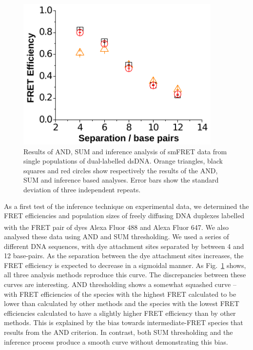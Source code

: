 \begin{figure}
   \begin{center}
      \includegraphics*[width=4in]{inference/fig6_single_ppltn.pdf}
      \caption{Results of AND, SUM and inference analysis of smFRET data from single populations of dual-labelled dsDNA. Orange triangles, black squares and red circles show respectively the results of the AND, SUM and inference based analyses. Error bars show the standard deviation of three independent repeats.}
      \label{fig:fig6_real_single}
   \end{center}
\end{figure}

As a first test of the inference technique on experimental data, we determined the FRET efficiencies and population sizes of freely diffusing DNA duplexes labelled with the FRET pair of dyes Alexa Fluor\textsuperscript{\textregistered} 488 and Alexa Fluor\textsuperscript{\textregistered} 647. We also analysed these data using AND and SUM thresholding. We used a series of different DNA sequences, with dye attachment sites separated by between 4 and 12 base-pairs. As the separation between the dye attachment sites increases, the FRET efficiency is expected to decrease in a sigmoidal manner. As Fig.~\ref{fig:fig6_real_single} shows, all three analysis methods reproduce this curve. The discrepancies between these curves are interesting. AND thresholding shows a somewhat squashed curve -- with FRET efficiencies of the species with the highest FRET calculated to be lower than calculated by other methods and the species with the lowest FRET efficiencies calculated to have a slightly higher FRET efficiency than by other methods. This is explained by the bias towards intermediate-FRET species that results from the AND criterion. In contrast, both SUM thresholding and the inference process produce a smooth curve without demonstrating this bias. 

